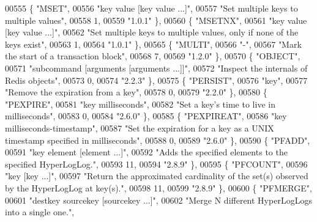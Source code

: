 \begin{DoxyCode}
00555     \{ \textcolor{stringliteral}{"MSET"},
00556     \textcolor{stringliteral}{"key value [key value ...]"},
00557     \textcolor{stringliteral}{"Set multiple keys to multiple values"},
00558     1,
00559     \textcolor{stringliteral}{"1.0.1"} \},
00560     \{ \textcolor{stringliteral}{"MSETNX"},
00561     \textcolor{stringliteral}{"key value [key value ...]"},
00562     \textcolor{stringliteral}{"Set multiple keys to multiple values, only if none of the keys exist"},
00563     1,
00564     \textcolor{stringliteral}{"1.0.1"} \},
00565     \{ \textcolor{stringliteral}{"MULTI"},
00566     \textcolor{stringliteral}{"-"},
00567     \textcolor{stringliteral}{"Mark the start of a transaction block"},
00568     7,
00569     \textcolor{stringliteral}{"1.2.0"} \},
00570     \{ \textcolor{stringliteral}{"OBJECT"},
00571     \textcolor{stringliteral}{"subcommand [arguments [arguments ...]]"},
00572     \textcolor{stringliteral}{"Inspect the internals of Redis objects"},
00573     0,
00574     \textcolor{stringliteral}{"2.2.3"} \},
00575     \{ \textcolor{stringliteral}{"PERSIST"},
00576     \textcolor{stringliteral}{"key"},
00577     \textcolor{stringliteral}{"Remove the expiration from a key"},
00578     0,
00579     \textcolor{stringliteral}{"2.2.0"} \},
00580     \{ \textcolor{stringliteral}{"PEXPIRE"},
00581     \textcolor{stringliteral}{"key milliseconds"},
00582     \textcolor{stringliteral}{"Set a key's time to live in milliseconds"},
00583     0,
00584     \textcolor{stringliteral}{"2.6.0"} \},
00585     \{ \textcolor{stringliteral}{"PEXPIREAT"},
00586     \textcolor{stringliteral}{"key milliseconds-timestamp"},
00587     \textcolor{stringliteral}{"Set the expiration for a key as a UNIX timestamp specified in milliseconds"},
00588     0,
00589     \textcolor{stringliteral}{"2.6.0"} \},
00590     \{ \textcolor{stringliteral}{"PFADD"},
00591     \textcolor{stringliteral}{"key element [element ...]"},
00592     \textcolor{stringliteral}{"Adds the specified elements to the specified HyperLogLog."},
00593     11,
00594     \textcolor{stringliteral}{"2.8.9"} \},
00595     \{ \textcolor{stringliteral}{"PFCOUNT"},
00596     \textcolor{stringliteral}{"key [key ...]"},
00597     \textcolor{stringliteral}{"Return the approximated cardinality of the set(s) observed by the HyperLogLog at key(s)."},
00598     11,
00599     \textcolor{stringliteral}{"2.8.9"} \},
00600     \{ \textcolor{stringliteral}{"PFMERGE"},
00601     \textcolor{stringliteral}{"destkey sourcekey [sourcekey ...]"},
00602     \textcolor{stringliteral}{"Merge N different HyperLogLogs into a single one."},

\end{DoxyCode}
